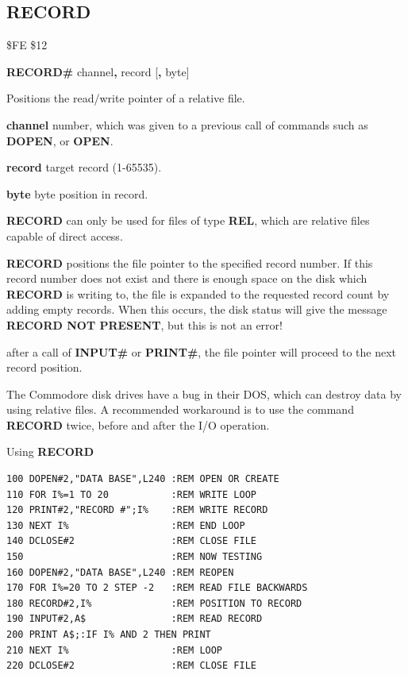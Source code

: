 
\newpage
\subsection{RECORD}
\begin{description}[leftmargin=2cm,style=nextline]
\item [Token:] \$FE \$12
\item [Format:] {\bf RECORD\#} channel{\bf,} record [{\bf,} byte]
\item [Usage:]  Positions the read/write pointer of a relative file.

                {\bf channel} number, which was given to a previous
                call of commands such as {\bf DOPEN}, or {\bf OPEN}.

                {\bf record} target record (1-65535).

                {\bf byte} byte position in record.

                {\bf RECORD} can only be used for files of
                type {\bf REL}, which are relative files capable
                of direct access.

               {\bf RECORD} positions the file pointer
               to the specified record number. If this record number
               does not exist and there is enough space on the disk
               which {\bf RECORD} is writing to,
               the file is expanded to the requested record count by adding
               empty records. When this occurs, the disk
               status will give the message {\bf RECORD NOT PRESENT}, but
               this is not an error!

               after a call of {\bf INPUT\#} or {\bf PRINT\#}, the file pointer will proceed
               to the next record position.

\item [Remarks:] The Commodore disk drives have a bug
               in their DOS, which can destroy data by using
               relative files. A recommended workaround is to
               use the command {\bf RECORD} twice, before
               and after the I/O operation.

\item [Example:] Using {\bf RECORD}
\begin{tcolorbox}[colback=black,coltext=white]
\verbatimfont{\codefont}
\begin{verbatim}
100 DOPEN#2,"DATA BASE",L240 :REM OPEN OR CREATE
110 FOR I%=1 TO 20           :REM WRITE LOOP
120 PRINT#2,"RECORD #";I%    :REM WRITE RECORD
130 NEXT I%                  :REM END LOOP
140 DCLOSE#2                 :REM CLOSE FILE
150                          :REM NOW TESTING
160 DOPEN#2,"DATA BASE",L240 :REM REOPEN
170 FOR I%=20 TO 2 STEP -2   :REM READ FILE BACKWARDS
180 RECORD#2,I%              :REM POSITION TO RECORD
190 INPUT#2,A$               :REM READ RECORD
200 PRINT A$;:IF I% AND 2 THEN PRINT
210 NEXT I%                  :REM LOOP
220 DCLOSE#2                 :REM CLOSE FILE


\end{verbatim}
\end{tcolorbox}
\end{description}

